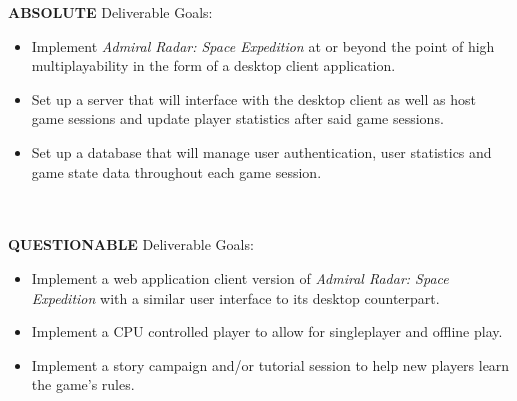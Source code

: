 \textbf{ABSOLUTE} Deliverable Goals:
  \begin{itemize} \\
    \item Implement \textit{Admiral Radar: Space Expedition} at or beyond the point of high multiplayability in the form of a desktop client application.
    \item Set up a server that will interface with the desktop client as well as host game sessions and update player statistics after said game sessions.
    \item Set up a database that will manage user authentication, user statistics and game state data throughout each game session.
  \end{itemize}
\\\\
\textbf{QUESTIONABLE} Deliverable Goals:
  \begin{itemize} \\
    \item Implement a web application client version of \textit{Admiral Radar: Space Expedition} with a similar user interface to its desktop counterpart.
    \item Implement a CPU controlled player to allow for singleplayer and offline play.
    \item Implement a story campaign and/or tutorial session to help new players learn the game’s rules.
  \end{itemize}
